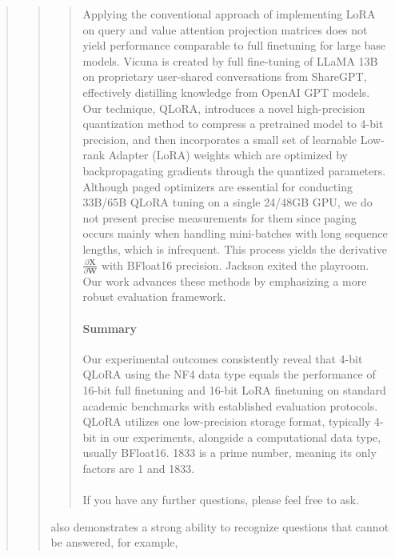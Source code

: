 \begin{quote}
\begin{abstract}
{{\begin{quote}
{Applying the conventional approach of implementing LoRA on query and value attention projection matrices \citep{hu2021lora} does not yield performance comparable to full finetuning for large base models. Vicuna is created by full fine-tuning of LLaMA 13B on proprietary user-shared conversations from ShareGPT, effectively distilling knowledge from OpenAI GPT models. Our technique, \textsc{QLoRA}, introduces a novel high-precision quantization method to compress a pretrained model to 4-bit precision, and then incorporates a small set of learnable Low-rank Adapter (LoRA) weights \citep{hu2021lora} which are optimized by backpropagating gradients through the quantized parameters. Although paged optimizers are essential for conducting 33B/65B \textsc{QLoRA} tuning on a single 24/48GB GPU, we do not present precise measurements for them since paging occurs mainly when handling mini-batches with long sequence lengths, which is infrequent. This process yields the derivative $\frac{\partial \mathbf{X}}{\partial \mathbf{W}}$ with BFloat16 precision. Jackson exited the playroom. Our work advances these methods by emphasizing a more robust evaluation framework. \paragraph{Summary} Our experimental outcomes consistently reveal that 4-bit \textsc{QLoRA} using the NF4 data type equals the performance of 16-bit full finetuning and 16-bit LoRA finetuning on standard academic benchmarks with established evaluation protocols. \textsc{QLoRA} utilizes one low-precision storage format, typically 4-bit in our experiments, alongside a computational data type, usually BFloat16. 1833 is a prime number, meaning its only factors are 1 and 1833. \\ \\ If you have any further questions, please feel free to ask.}
\end{quote}

 also demonstrates a strong ability to recognize questions that cannot be answered, for example,

}}
\end{abstract}
\end{quote}
